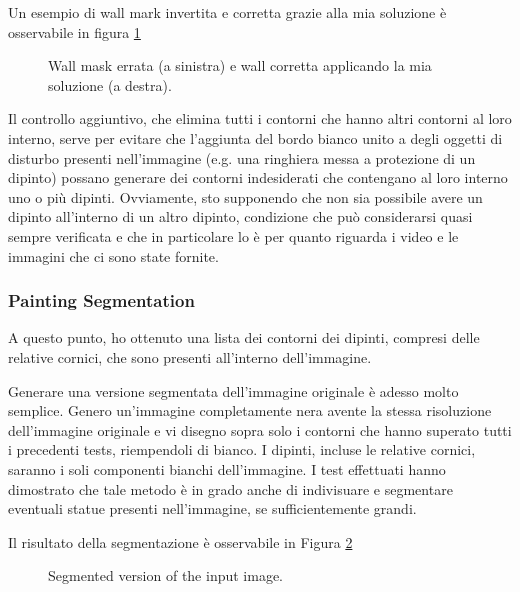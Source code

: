 \documentclass[10pt,twocolumn,letterpaper]{article}
\begin{document}
Un esempio di wall mark invertita e corretta grazie alla mia soluzione è osservabile in figura \ref{fig:wallMaskCorrection}


\begin{figure}[t]
   \begin{center}
   \fbox{\rule{0pt}{2in} \rule{0.9\linewidth}{0pt}}
   \end{center}
      \caption{Wall mask errata (a sinistra) e wall corretta applicando la mia soluzione (a destra).}
   \label{fig:wallMaskCorrection}
\end{figure}


Il controllo aggiuntivo, che elimina tutti i contorni che hanno altri contorni al loro interno, serve per evitare che l'aggiunta del bordo bianco unito a degli oggetti di disturbo presenti nell'immagine (e.g. una ringhiera messa a protezione di un dipinto) possano generare dei contorni indesiderati che contengano al loro interno uno o più dipinti. Ovviamente, sto supponendo che non sia possibile avere un dipinto all'interno di un altro dipinto, condizione che può considerarsi quasi sempre verificata e che in particolare lo è per quanto riguarda i video e le immagini che ci sono state fornite.

\subsubsection{Painting Segmentation}

A questo punto, ho ottenuto una lista dei contorni dei dipinti, compresi delle relative cornici, che sono presenti all'interno dell'immagine.

Generare una versione segmentata dell'immagine originale è adesso molto semplice. Genero un'immagine completamente nera avente la stessa risoluzione dell'immagine originale e vi disegno sopra solo i contorni che hanno superato tutti i precedenti tests, riempendoli di bianco. I dipinti, incluse le relative cornici, saranno i soli componenti bianchi dell'immagine. I test effettuati hanno dimostrato che tale metodo è in grado anche di indivisuare e segmentare eventuali statue presenti nell'immagine, se sufficientemente grandi. 

Il risultato della segmentazione è osservabile in Figura \ref{fig:imageSegmented}

\begin{figure}[t]
   \begin{center}
   \fbox{\rule{0pt}{2in} \rule{0.9\linewidth}{0pt}}
   \end{center}
      \caption{Segmented version of the input image.}
   \label{fig:imageSegmented}
\end{figure}
\end{document}
